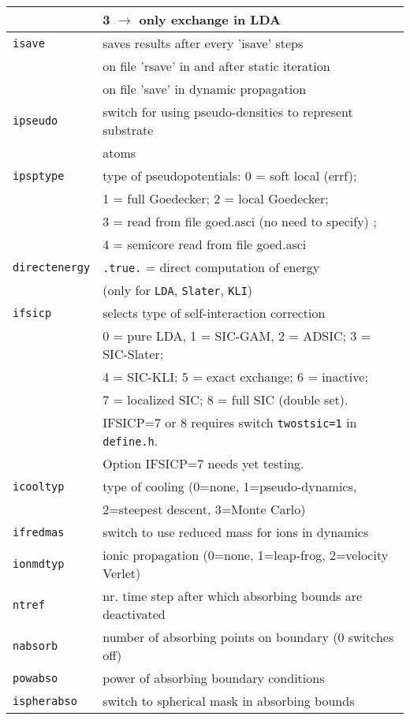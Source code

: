 \documentclass[11pt,a4paper]{article}
\begin{document}
\begin{table}[t]
\begin{tabular}{|p{3.5cm}|p{11.2cm}|}
						& 3 $\rightarrow$ only exchange in  LDA \\
					\hline
					\texttt{isave}& saves results after every 'isave' steps \\
					\texttt{}& on file 'rsave' in and after static iteration\\
					\texttt{}& on file 'save' in dynamic propagation\\
					\hline
					\texttt{ipseudo}& switch for using pseudo-densities to represent substrate\\
					\texttt{}& atoms \\
					\hline
					\texttt{ipsptype}& type of pseudopotentials: 0 = soft local (errf);\\
						& 1 = full Goedecker; 2 = local Goedecker;\\
						& 3 = read from file goed.asci (no need to specify)  ;\\
						& 4 = semicore read from file goed.asci\\
					\hline
					\texttt{directenergy}   & \texttt{.true.} = direct computation of energy \\
						& (only for \texttt{LDA}, \texttt{Slater}, \texttt{KLI})\\
					\hline
					\texttt{ifsicp}& selects type of self-interaction correction\\
						&  0 = pure LDA, 1 = SIC-GAM, 2 = ADSIC; 3 = SIC-Slater; \\
						&  4 = SIC-KLI; 5 = exact exchange; 6 = inactive;\\
						&  7 = localized SIC;  8 = full SIC (double set).\\
						& IFSICP=7 or 8 requires switch \texttt{twostsic=1} in \texttt{define.h}.\\
						& Option IFSICP=7 needs yet testing.\\
					\hline
					\texttt{icooltyp}& type of cooling (0=none, 1=pseudo-dynamics,\\
					\texttt{}& 2=steepest descent, 3=Monte Carlo)\\
					\hline
					\texttt{ifredmas}& switch to use reduced mass for ions in dynamics\\
					\hline
					\texttt{ionmdtyp}& ionic propagation (0=none, 1=leap-frog, 2=velocity Verlet)\\
					\hline
					\texttt{ntref}& nr. time step after which absorbing bounds are deactivated\\
					\hline
					\texttt{nabsorb}& number of absorbing points on boundary (0 switches off)\\
					\hline
					\texttt{powabso}& power of absorbing boundary conditions\\
					\hline
					\texttt{ispherabso}& switch to spherical mask in absorbing bounds\\
					\hline
				\end{tabular}
			\end{table}
\end{document}
